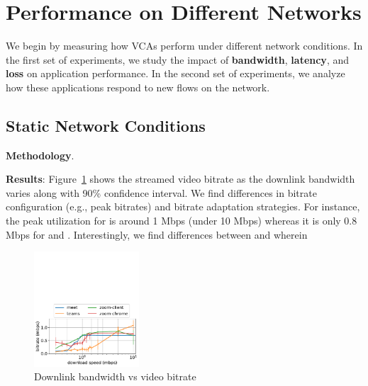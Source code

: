 \section{Performance on Different Networks}\label{sec:methodology}
We begin by measuring how VCAs perform under different network conditions. 
In the first set of experiments, we study the impact of \textbf{bandwidth}, \textbf{latency}, 
and \textbf{loss} on application performance. In the second set of experiments, 
we analyze how these applications respond to new flows on the network.
\subsection{Static Network Conditions}


\noindent\textbf{Methodology}. 


\noindent \textbf{Results}: Figure~\ref{fig:downlink_video_bitrate} shows the streamed video bitrate as the downlink bandwidth varies along with 90\% confidence interval. We find differences in bitrate configuration (e.g., peak bitrates) and bitrate adaptation strategies. For instance, the peak utilization for \teams is around 1 Mbps (under 10 Mbps) whereas it is only 0.8 Mbps for \meet and . Interestingly, we find differences between \zoomnative and \zoombrowser wherein 


\begin{figure}[]
    \includegraphics[width=0.35\textwidth,keepaspectratio]{figures/static/downlink_bitrate_meet_teams_zoom.pdf}
    \caption{Downlink bandwidth vs video bitrate}
	\label{fig:downlink_video_bitrate}
\end{figure}


